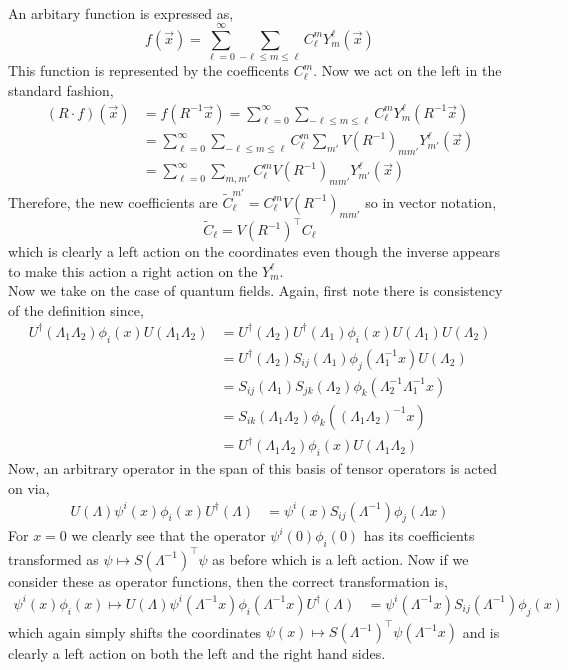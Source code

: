 \documentclass[12pt]{extarticle}
\theoremstyle{definition}
\begin{document}
\bigskip\\
An arbitary function is expressed as,
\[ f(\vec{x}) = \sum_{\ell = 0}^\infty \sum_{-\ell \le m \le \ell} C^m_\ell Y^\ell_m(\vec{x}) \]
This function is represented by the coefficents $C^m_\ell$. Now we act on the left in the standard fashion,
\begin{align*}
(R \cdot f)(\vec{x}) & = f(R^{-1} \vec{x}) =  \sum_{\ell = 0}^\infty \sum_{-\ell \le m \le \ell} C^m_\ell Y^\ell_m(R^{-1} \vec{x})
\\
& = \sum_{\ell = 0}^\infty \sum_{-\ell \le m \le \ell} C^m_\ell \sum_{m'} V(R^{-1})_{m m'} Y^{\ell}_{m'}(\vec{x})
\\
& = \sum_{\ell = 0}^\infty \sum_{m, m'} C^m_{\ell} V(R^{-1})_{m m'} Y^{\ell}_{m'}(\vec{x})
\end{align*}
Therefore, the new coefficients are $\tilde{C}^{m'}_\ell = C^m_\ell V(R^{-1})_{m m'}$ so in vector notation,
\[ \tilde{C}_\ell = V(R^{-1})^\top C_\ell \] which is clearly a left action on the coordinates even though the inverse appears to make this action a right action on the $Y^\ell_m$. 
\bigskip\\
Now we take on the case of quantum fields. Again, first note there is consistency of the definition since,
\begin{align*}
U^\dagger(\Lambda_1 \Lambda_2) \phi_i(x) U(\Lambda_1 \Lambda_2) & = U^\dagger(\Lambda_2) U^\dagger(\Lambda_1) \phi_i(x) U(\Lambda_1) U(\Lambda_2) 
\\
& = U^\dagger(\Lambda_2) S_{ij}(\Lambda_1) \phi_j(\Lambda_1^{-1} x) U(\Lambda_2)
\\
& = S_{ij}(\Lambda_1) S_{jk}(\Lambda_2) \phi_k(\Lambda_2^{-1} \Lambda_1^{-1} x) 
\\
& = S_{ik}(\Lambda_1 \Lambda_2) \phi_k((\Lambda_1 \Lambda_2)^{-1} x)
\\
& = U^\dagger(\Lambda_1 \Lambda_2) \phi_i(x) U(\Lambda_1 \Lambda_2)
\end{align*}
Now, an arbitrary operator in the span of this basis of tensor operators is acted on via,
\begin{align*}
U(\Lambda) \psi^i(x) \phi_i(x) U^\dagger(\Lambda) & = \psi^i(x) S_{ij}(\Lambda^{-1}) \phi_j(\Lambda x)
\end{align*}
For $x = 0$ we clearly see that the operator $\psi^i(0) \phi_i(0)$ has its coefficients transformed as $\psi \mapsto S(\Lambda^{-1})^\top \psi$ as before which is a left action. Now if we consider these as operator functions, then the correct transformation is,
\begin{align*}
\psi^i(x) \phi_i(x) \mapsto U(\Lambda) \psi^i(\Lambda^{-1} x) \phi_i(\Lambda^{-1} x) U^\dagger(\Lambda) & = \psi^i(\Lambda^{-1} x) S_{ij}(\Lambda^{-1}) \phi_j(x) 
\end{align*}
which again simply shifts the coordinates $\psi(x) \mapsto S(\Lambda^{-1})^\top \psi(\Lambda^{-1} x)$ and is clearly a left action on both the left and the right hand sides. 
\end{document}
